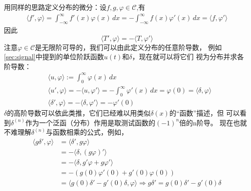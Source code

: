 \documentclass{ctexbook}
\begin{document}
用同样的思路定义分布的微分：设$f,g,\varphi\in\mathcal{C} $,有
\begin{align*}
    \langle f',\varphi\rangle=\int_{-\infty}^{\infty}f'(x)\varphi(x)\,dx=-\int_{-\infty}^{\infty}f(x)\varphi'(x)\,dx=\langle f,\varphi'\rangle
\end{align*}
因此
\begin{equation}
    \langle T',\varphi\rangle=-\langle T,\varphi'\rangle
\end{equation}
注意$\varphi\in\mathcal{C} $是无限阶可导的，我们可以由此定义分布的任意阶导数，
例如\ref{sec:signal}中提到的单位阶跃函数$u(t)$和$\delta$，现在就可以将它们
视为分布并求各阶导数：
\begin{align*}
     & \langle u,\varphi\rangle:=\int_{0}^{\infty}\varphi(x)\,dx                                                                      \\
     & \langle u',\varphi\rangle=-\langle u,\varphi'\rangle=-\int_{0}^{\infty}\varphi'(x)\,dx=\varphi(0)=\langle\delta,\varphi\rangle \\
     & \langle \delta',\varphi\rangle=-\langle \delta,\varphi'\rangle=-\varphi'(0)
\end{align*}
$\delta$的高阶导数可以依此类推，它们已经难以用类似$\delta(x)$的“函数”描述，但
可以看到$\delta^{(n)}$作为一个泛函（分布）作用是取测试函数的$(-1)^n$倍的n阶导。
现在也就不难理解$\delta^{(n)}$与函数相乘的公式，例如，
\begin{align*}
    \langle g\delta',\varphi\rangle & =\langle \delta',g\varphi\rangle                \\
                                    & =-\langle\delta,(g\varphi)'\rangle              \\
                                    & =-\langle\delta,g'\varphi+g\varphi'\rangle      \\
                                    & =-(g(0)\varphi'(0)+g'(0)\varphi(0))             \\
                                    & =\langle g(0)\delta'-g'(0)\delta,\varphi\rangle
    \Rightarrow g\delta'=g(0)\delta'-g'(0)\delta
\end{align*}
\end{document}

